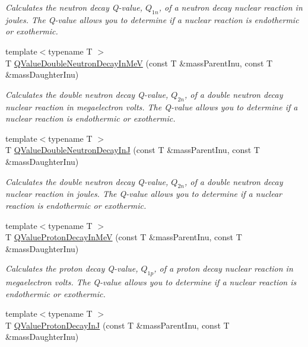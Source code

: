\begin{DoxyCompactItemize}
\begin{DoxyCompactList}\small\item\em Calculates the neutron decay Q-\/value, $Q_{1n}$, of a neutron decay nuclear reaction in joules. The Q-\/value allows you to determine if a nuclear reaction is endothermic or exothermic. \end{DoxyCompactList}\item 
{\footnotesize template$<$typename T $>$ }\\T \hyperlink{group___q_value_ga6bfea723aca78b32ea67cc1ca7b4031b}{Q\+Value\+Double\+Neutron\+Decay\+In\+MeV} (const T \&mass\+Parent\+Inu, const T \&mass\+Daughter\+Inu)
\begin{DoxyCompactList}\small\item\em Calculates the double neutron decay Q-\/value, $Q_{2n}$, of a double neutron decay nuclear reaction in megaelectron volts. The Q-\/value allows you to determine if a nuclear reaction is endothermic or exothermic. \end{DoxyCompactList}\item 
{\footnotesize template$<$typename T $>$ }\\T \hyperlink{group___q_value_gada1ace2aa0a791df382f120767a56fe9}{Q\+Value\+Double\+Neutron\+Decay\+InJ} (const T \&mass\+Parent\+Inu, const T \&mass\+Daughter\+Inu)
\begin{DoxyCompactList}\small\item\em Calculates the double neutron decay Q-\/value, $Q_{2n}$, of a double neutron decay nuclear reaction in joules. The Q-\/value allows you to determine if a nuclear reaction is endothermic or exothermic. \end{DoxyCompactList}\item 
{\footnotesize template$<$typename T $>$ }\\T \hyperlink{group___q_value_ga514354518df3bf1cde561b6d75879ef0}{Q\+Value\+Proton\+Decay\+In\+MeV} (const T \&mass\+Parent\+Inu, const T \&mass\+Daughter\+Inu)
\begin{DoxyCompactList}\small\item\em Calculates the proton decay Q-\/value, $Q_{1p}$, of a proton decay nuclear reaction in megaelectron volts. The Q-\/value allows you to determine if a nuclear reaction is endothermic or exothermic. \end{DoxyCompactList}\item 
{\footnotesize template$<$typename T $>$ }\\T \hyperlink{group___q_value_gaa344322393356bd442d17c992628218a}{Q\+Value\+Proton\+Decay\+InJ} (const T \&mass\+Parent\+Inu, const T \&mass\+Daughter\+Inu)

\end{DoxyCompactItemize}
